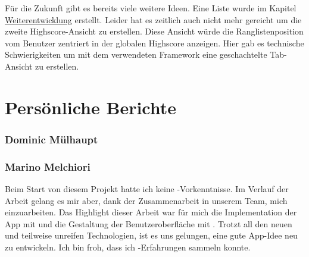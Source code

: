 Für die Zukunft gibt es bereits viele weitere Ideen. 
Eine Liste wurde im Kapitel \hyperref[pd-resultate-weiterentwicklung]{Weiterentwicklung} erstellt. 
Leider hat es zeitlich auch nicht mehr gereicht um die zweite Highscore-Ansicht zu erstellen. 
Diese Ansicht würde die Ranglistenposition vom Benutzer zentriert in der globalen Highscore anzeigen. 
Hier gab es technische Schwierigkeiten um mit dem verwendeten \gls{Framework}  eine geschachtelte Tab-Ansicht zu erstellen.

\section{Persönliche Berichte}

\subsubsection{Dominic Mülhaupt}

\subsubsection{Marino Melchiori}
Beim Start von diesem Projekt hatte ich keine -Vorkenntnisse.
Im Verlauf der Arbeit gelang es mir aber, dank der Zusammenarbeit in unserem Team, mich einzuarbeiten.
Das Highlight dieser Arbeit war für mich die Implementation der App mit  und die Gestaltung der Benutzeroberfläche mit .
Trotzt all den neuen und teilweise unreifen Technologien, ist es uns gelungen, eine gute App-Idee neu zu entwickeln.
Ich bin froh, dass ich -Erfahrungen sammeln konnte.